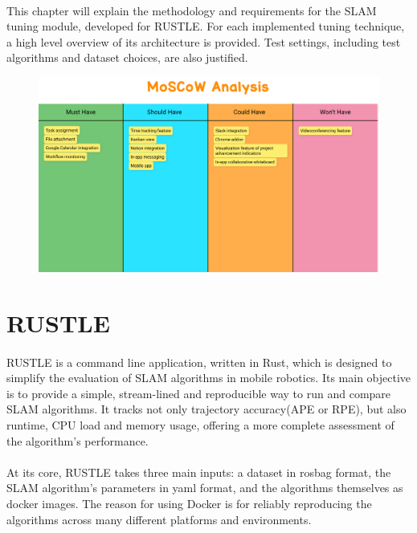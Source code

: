 \paragraph{}This chapter will explain the methodology and requirements for the \ac{SLAM} tuning module, developed for \ac{RUSTLE}. For each implemented tuning technique, a high level overview of its architecture is provided. Test settings, including test algorithms and dataset choices, are also justified.

\begin{figure}[h]
\includegraphics[width=0.85\linewidth]{images/moscow.png}
\end{figure}

\section{\ac{RUSTLE}}

\paragraph{}\ac{RUSTLE} is a command line application, written in Rust, which is designed to simplify the evaluation of SLAM algorithms in mobile robotics.
Its main objective is to provide a simple, stream-lined and reproducible way to run and compare SLAM algorithms. It tracks not only trajectory accuracy(APE or RPE), but also runtime, CPU load and memory usage, offering a more complete assessment of the algorithm's performance.

\paragraph{}At its core, RUSTLE takes three main inputs: a dataset in rosbag format, the SLAM algorithm's parameters in yaml format, and the algorithms themselves as docker images. The reason for using Docker is for reliably reproducing the algorithms across many different platforms and environments.


